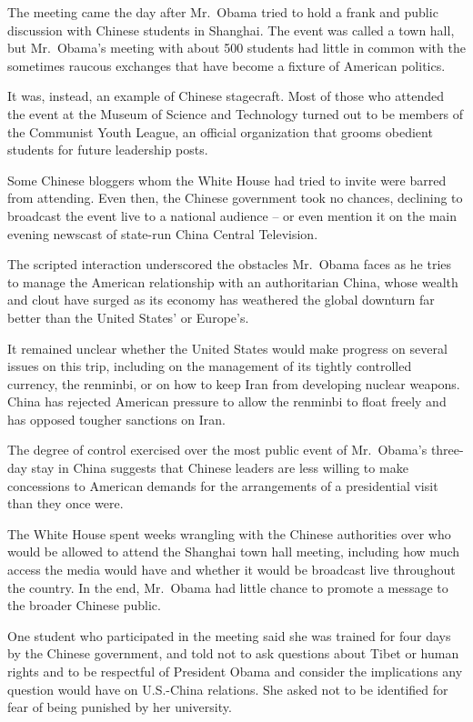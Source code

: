 ﻿\documentclass[12pt]{article}
\begin{document}
The meeting came the day after Mr.~Obama tried to hold a frank and public discussion with Chinese
students in Shanghai. The event was called a town hall, but Mr.~Obama's meeting with about 500
students had little in common with the sometimes raucous exchanges that have become a fixture of
American politics.

It was, instead, an example of Chinese stagecraft. Most of those who attended the event at the
Museum of Science and Technology turned out to be members of the Communist Youth League, an official
organization that grooms obedient\cite{obedient} students for future leadership posts.

Some Chinese bloggers whom the White House had tried to invite were barred from attending. Even
then, the Chinese government took no chances, declining to broadcast the event live to a national
audience -- or even mention it on the main evening newscast of state-run China Central Television.

The scripted interaction underscored the obstacles Mr.~Obama faces as he tries to manage the
American relationship with an authoritarian China, whose wealth and clout have surged as its economy
has weathered the global downturn far better than the United States' or Europe's.

It remained unclear whether the United States would make progress on several issues on this trip,
including on the management of its tightly controlled currency, the renminbi, or on how to keep Iran
from developing nuclear weapons. China has rejected American pressure to allow the renminbi to float
freely and has opposed tougher sanctions on Iran.

The degree of control exercised over the most public event of Mr.~Obama's three-day stay in China
suggests that Chinese leaders are less willing to make concessions to American demands for the
arrangements of a presidential visit than they once were.

The White House spent weeks wrangling with the Chinese authorities over who would be allowed to
attend the Shanghai town hall meeting, including how much access the media would have and whether it
would be broadcast live throughout the country. In the end, Mr.~Obama had little chance to promote a
message to the broader Chinese public.

One student who participated in the meeting said she was trained for four days by the Chinese
government, and told not to ask questions about Tibet or human rights and to be respectful of
President Obama and consider the implications any question would have on U.S.-China relations. She
asked not to be identified for fear of being punished by her university.
\end{document}
